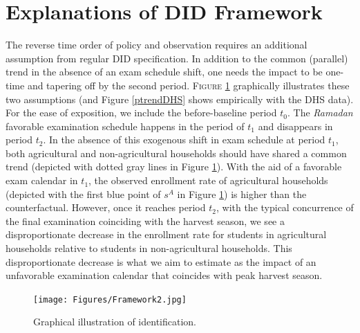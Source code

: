 \documentclass[12pt,letterpaper]{article}
\newcommand{\0}{\ensuremath{\mbox{\boldmath $0$}}}
\begin{document}
\pagebreak

\section{Explanations of DID Framework}\label{app_a2}

The reverse time order of policy and observation requires an additional assumption from regular DID specification. In addition to the common (parallel) trend in the absence of an exam schedule shift, one needs the impact to be one-time and tapering off by the second period. \textsc{\small Figure \ref{ididea}} graphically illustrates these two assumptions (and Figure \ref{ptrendDHS} shows empirically with the DHS data). For the ease of exposition, we include the before-baseline period $t_{0}$. The \textit{Ramadan} favorable examination schedule happens in the period of $t_{1}$ and disappears in period $t_{2}$. In the absence of this exogenous shift in exam schedule at period $t_{1}$, both agricultural and non-agricultural households should have shared a common trend (depicted with dotted gray lines in Figure \ref{ididea}). With the aid of a favorable exam calendar in $t_{1}$, the observed enrollment rate of agricultural households (depicted with the first blue point of $s^{A}$ in Figure \ref{ididea}) is higher than the counterfactual. However, once it reaches period $t_{2}$, with the typical concurrence of the final examination coinciding with the harvest season, we see a disproportionate decrease in the enrollment rate for students in agricultural households relative to students in non-agricultural households. This disproportionate decrease is what we aim to estimate as the impact of an unfavorable examination calendar that coincides with peak harvest season.

\begin{figure}[h!]
\centering
\texttt{[image: Figures/Framework2.jpg]}\\
\caption{Graphical illustration of identification.\protect\footnotemark}
\label{ididea}
\end{figure}

\end{document}
